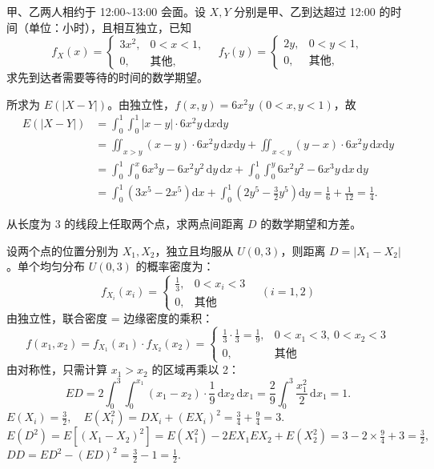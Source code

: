 \documentclass[lang=cn,11pt]{elegantbook}
\begin{document}
\begin{exercise}\label{exer:4-8-wait}
甲、乙两人相约于 12:00\textasciitilde 13:00 会面。设 \(X, Y\) 分别是甲、乙到达超过 12:00 的时间（单位：小时），且相互独立，已知
\[
f_X(x) = \begin{cases} 3x^2, & 0 < x < 1, \\ 0, & \text{其他}, \end{cases}\quad
f_Y(y) = \begin{cases} 2y, & 0 < y < 1, \\ 0, & \text{其他}, \end{cases}
\]
求先到达者需要等待的时间的数学期望。
\end{exercise}
\begin{solution}
所求为 \(E(|X-Y|)\)。由独立性，\(f(x,y) = 6x^2y\ (0 < x,y < 1)\)，故
\[
\begin{aligned}
E(|X-Y|) &= \int_0^1\!\!\int_0^1 |x-y| \cdot 6x^2 y\,\mathrm{d}x\mathrm{d}y \\
&= \iint_{x>y} (x-y) \cdot 6x^2 y\,\mathrm{d}x\mathrm{d}y + \iint_{x<y} (y-x) \cdot 6x^2 y\,\mathrm{d}x\mathrm{d}y \\
&= \int_0^1\!\!\int_0^x 6x^3y - 6x^2y^2\,\mathrm{d}y\,\mathrm{d}x + \int_0^1\!\!\int_0^y 6x^2y^2 - 6x^3y\,\mathrm{d}x\,\mathrm{d}y \\
&= \int_0^1 \!\left(3x^5 - 2x^5\right)\mathrm{d}x + \int_0^1 \!\left(2y^5 - \frac{3}{2}y^5\right)\mathrm{d}y = \frac{1}{6} + \frac{1}{12} = \frac{1}{4}.
\end{aligned}
\]
\end{solution}


\begin{exercise}\label{exer:4-two-points}
从长度为 3 的线段上任取两个点，求两点间距离 \(D\) 的数学期望和方差。
\end{exercise}
\begin{solution}
设两个点的位置分别为 \(X_1, X_2\)，独立且均服从 \(U(0,3)\)，则距离 \(D = |X_1 - X_2|\)。单个均匀分布 \( U(0,3) \) 的概率密度为：
\[f_{X_i}(x_i) =\begin{cases}\displaystyle \frac{1}{3}, & 0 < x_i < 3 \\0, & \text{其他}\end{cases}\quad (i=1,2)\]
由独立性，联合密度 = 边缘密度的乘积：
  \[
  f(x_1,x_2) = f_{X_1}(x_1) \cdot f_{X_2}(x_2) =
  \begin{cases}
  \displaystyle \frac{1}{3} \cdot \frac{1}{3} = \frac{1}{9}, & 0 < x_1 < 3,\ 0 < x_2 < 3 \\
  0, & \text{其他}
  \end{cases}
  \]
由对称性，只需计算 \(x_1 > x_2\) 的区域再乘以 2：
\[
ED = 2\int_0^3 \int_0^{x_1} (x_1 - x_2) \cdot \frac{1}{9}\,\mathrm{d}x_2\,\mathrm{d}x_1
= \frac{2}{9}\int_0^3 \frac{x_1^2}{2}\,\mathrm{d}x_1 = 1.
\]
\(
E(X_i) = \frac{3}{2},\quad E(X_i^2) = DX_i + (EX_i)^2 = \frac{3}{4} + \frac{9}{4} = 3.
\)
\(
E(D^2) = E[(X_1 - X_2)^2] = E(X_1^2) - 2EX_1 EX_2 + E(X_2^2) = 3 - 2 \times \frac{9}{4} + 3 = \frac{3}{2},
\)
\(
DD = ED^2 - (ED)^2 = \frac{3}{2} - 1 = \frac{1}{2}.
\)
\end{solution}
\end{document}
